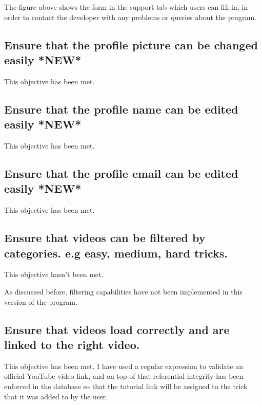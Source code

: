 The figure above shows the form in the support tab which users can fill in, in order to contact the developer with any problems or queries about the program.



\subsection {Ensure that the profile picture can be changed easily *NEW*} %

This objective has been met.



\subsection {Ensure that the profile name can be edited easily *NEW*} %

This objective has been met.




\subsection {Ensure that the profile email can be edited easily *NEW*} %

This objective has been met.




\subsection {Ensure that videos can be filtered by categories. e.g easy, medium, hard tricks.}

This objective hasn't been met.

As discussed before, filtering capabilities have not been implemented in this version of the program.




\subsection {Ensure that videos load correctly and are linked to the right video.}

This objective has been met. I have used a regular expression to validate an official YouTube video link, and on top of that referential integrity has been enforced in the database so that the tutorial link will be assigned to the trick that it was added to by the user. 




